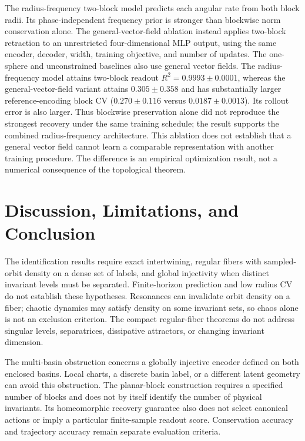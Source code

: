 \documentclass[10pt]{article}
\theoremstyle{definition}
\theoremstyle{remark}
\begin{document}
The radius-frequency two-block model predicts each angular rate from both block radii. Its phase-independent frequency prior is stronger than blockwise norm conservation alone. The general-vector-field ablation instead applies two-block retraction to an unrestricted four-dimensional MLP output, using the same encoder, decoder, width, training objective, and number of updates. The one-sphere and unconstrained baselines also use general vector fields. The radius-frequency model attains two-block readout $R^2=0.9993\pm0.0001$, whereas the general-vector-field variant attains $0.305\pm0.358$ and has substantially larger reference-encoding block CV ($0.270\pm0.116$ versus $0.0187\pm0.0013$). Its rollout error is also larger. Thus blockwise preservation alone did not reproduce the strongest recovery under the same training schedule; the result supports the combined radius-frequency architecture. This ablation does not establish that a general vector field cannot learn a comparable representation with another training procedure. The difference is an empirical optimization result, not a numerical consequence of the topological theorem.

\section{Discussion, Limitations, and Conclusion}
\label{sec:discussion}

The identification results require exact intertwining, regular fibers with sampled-orbit density on a dense set of labels, and global injectivity when distinct invariant levels must be separated. Finite-horizon prediction and low radius CV do not establish these hypotheses. Resonances can invalidate orbit density on a fiber; chaotic dynamics may satisfy density on some invariant sets, so chaos alone is not an exclusion criterion. The compact regular-fiber theorems do not address singular levels, separatrices, dissipative attractors, or changing invariant dimension.

The multi-basin obstruction concerns a globally injective encoder defined on both enclosed basins. Local charts, a discrete basin label, or a different latent geometry can avoid this obstruction. The planar-block construction requires a specified number of blocks and does not by itself identify the number of physical invariants. Its homeomorphic recovery guarantee also does not select canonical actions or imply a particular finite-sample readout score. Conservation accuracy and trajectory accuracy remain separate evaluation criteria.
\end{document}
